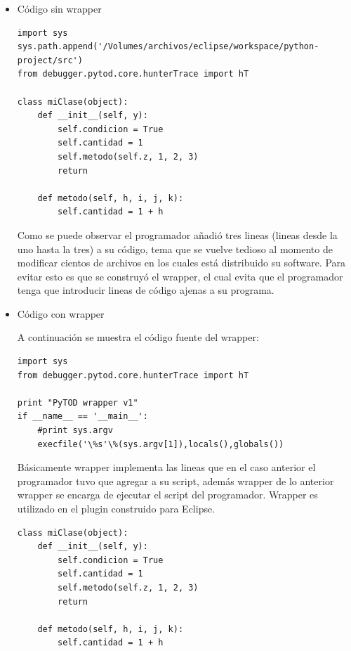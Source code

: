 \documentclass[12pt,legalpaper]{report}
\begin{document}
\begin{itemize}
	\item Código sin wrapper
\begin{singlespace}
\begin{lstlisting}[style=Python]
import sys
sys.path.append('/Volumes/archivos/eclipse/workspace/python-project/src')
from debugger.pytod.core.hunterTrace import hT

class miClase(object):
    def __init__(self, y):
        self.condicion = True
        self.cantidad = 1
        self.metodo(self.z, 1, 2, 3)
        return
    
    def metodo(self, h, i, j, k):
        self.cantidad = 1 + h
\end{lstlisting}
\end{singlespace}

Como se puede observar el programador añadió tres lineas (lineas desde la uno hasta la tres) a su código, tema que se vuelve tedioso al momento de modificar cientos de archivos en los cuales está distribuido su software.  Para evitar esto es que se construyó el wrapper, el cual evita que el programador tenga que introducir lineas de código ajenas a su programa.  

	\item Código con wrapper

A continuación se muestra el código fuente del wrapper:
	
\begin{singlespace}
\begin{lstlisting}[style=Python]
import sys
from debugger.pytod.core.hunterTrace import hT

print "PyTOD wrapper v1"
if __name__ == '__main__':
    #print sys.argv
    execfile('\%s'\%(sys.argv[1]),locals(),globals())
\end{lstlisting}
\end{singlespace}

Básicamente wrapper implementa las lineas que en el caso anterior el programador tuvo que agregar a su script, además wrapper de lo anterior wrapper se encarga de ejecutar el script del programador.  Wrapper es utilizado en el plugin construido para Eclipse.

\begin{singlespace}
\begin{lstlisting}[style=Python]
class miClase(object):
    def __init__(self, y):
        self.condicion = True
        self.cantidad = 1
        self.metodo(self.z, 1, 2, 3)
        return
    
    def metodo(self, h, i, j, k):
        self.cantidad = 1 + h       
\end{lstlisting}
\end{singlespace}
\end{itemize}
\end{document}
